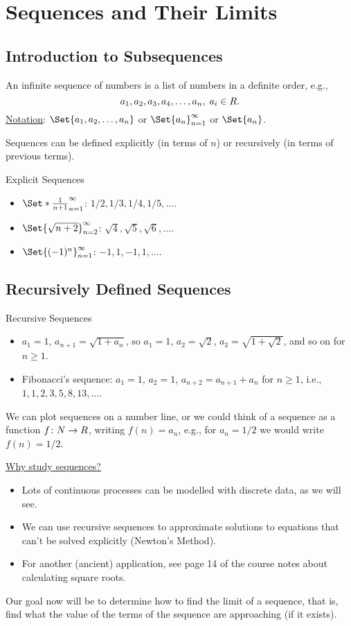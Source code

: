 \section{Sequences and Their Limits}
\subsection{Introduction to Subsequences}
\begin{Definition}{}{}
    An infinite sequence of numbers is a list of numbers in a definite order, e.g.,
    \[ a_1,a_2,a_3,a_4,\ldots,a_n,\; a_i\in\relax{R}. \]
    \underline{Notation}: $ \Set{a_1,a_2,\ldots,a_n} $ or $ \Set{a_n}_{n=1}^{\infty} $ or $ \Set{a_n} $.
\end{Definition}
Sequences can be defined explicitly (in terms of $ n $) or recursively (in terms of previous terms).
\begin{Example}{Explicit Sequences}{}
    \begin{itemize}
        \item $ \Set*{\frac{1}{n+1}}_{n=1}^{\infty} $: $ 1/2,1/3,1/4,1/5,\ldots $.
        \item $ \Set{\sqrt{n+2}}_{n=2}^{\infty} $: $ \sqrt{4},\sqrt{5},\sqrt{6},\ldots $.
        \item $ \Set{(-1)^n}_{n=1}^\infty $: $ -1,1,-1,1,\ldots $.
    \end{itemize}
\end{Example}
\subsection{Recursively Defined Sequences}
\begin{Example}{Recursive Sequences}{}
    \begin{itemize}
        \item $ a_1=1 $, $ a_{n+1}=\sqrt{1+a_n} $, so $ a_1=1 $, $ a_2=\sqrt{2} $, $ a_3=\sqrt{1+\sqrt{2}} $, and so on for $ n\ge 1 $.
        \item Fibonacci's sequence: $ a_1=1 $, $ a_2=1 $, $ a_{n+2}=a_{n+1}+a_n $ for $ n\ge 1 $, i.e.,
              $ 1,1,2,3,5,8,13,\ldots $.
    \end{itemize}
\end{Example}
We can plot sequences on a number line, or we could think of a sequence as a function $ f\colon \relax{N}\to\relax{R} $, writing $ f(n)=a_n $, e.g.,
for $ a_n=1/2 $ we would write $ f(n)=1/2 $.

\underline{Why study sequences?}
\begin{itemize}
    \item Lots of continuous processes can be modelled with discrete data, as we will see.
    \item We can use recursive sequences to approximate solutions to equations that can't be solved explicitly (Newton's Method).
    \item For another (ancient) application, see page 14 of the course notes about calculating square roots.
\end{itemize}
Our goal now will be to determine how to find the limit of a sequence, that is, find what the value of the terms of the sequence
are approaching (if it exists).

